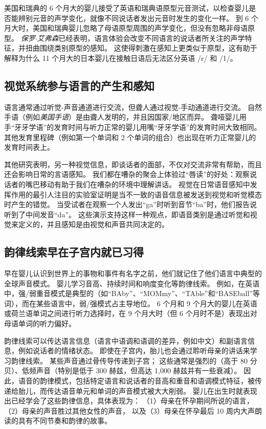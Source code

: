 美国和瑞典的 6 个月大的婴儿接受了英语和瑞典语原型元音测试，以检查婴儿是否能辨别元音的声学变化，就像不同说话者发出元音时发生的变化一样。
到 6 个月大时，美国和瑞典婴儿忽略了母语原型周围的声学变化，但没有忽略非母语原型。
\textit{保罗$\cdot$艾弗森}已经表明，语言体验会改变不同语言的说话者所关注的声学特征，并扭曲围绕类别原型的感知。
这使得刺激在感知上更类似于原型，这有助于解释为什么 11 个月大的日本婴儿在接触日语后无法区分英语 /r/ 和 /1/。



\subsection{视觉系统参与语言的产生和感知}

语言通常通过听觉-声音通道进行交流，但聋人通过视觉-手动通道进行交流。
自然手语（例如\textit{美国手语}）是由聋人发明的，并且因国家/地区而异。
聋哑婴儿用手“牙牙学语”的发育时间与听力正常的婴儿用嘴“牙牙学语”的发育时间大致相同。
其他发育里程碑（例如第一个单词和 2 个单词的组合）也出现在听力正常婴儿的发育时间表上。


其他研究表明，另一种视觉信息，即谈话者的面部，不仅对交流非常有帮助，而且还会影响日常的言语感知。
我们都在嘈杂的聚会上体验过“唇读”的好处：观察说话者的嘴巴移动有助于我们在嘈杂的环境中理解讲话。
视觉在日常语音感知中发挥作用的最引人注目的实验室证明是当不一致的语音信息被发送到视觉和听觉模态时产生的错觉。
当受试者在观察一个人发出“ga”时听到音节“ba”时，他们报告说听到了中间发音“da”。
这些演示支持这样一种观点，即语音类别是通过听觉和视觉来定义的，并且感知是由视觉和声音共同决定的。



\subsection{韵律线索早在子宫内就已习得}

早在婴儿认识到世界上的事物和事件有名字之前，他们就记住了他们语言中典型的全球声音模式。
婴儿学习音高、持续时间和响度变化等韵律线索。
例如，在英语中，强/弱重音模式是典型的（如“BAby”、“MOMmy”、“TAble”和“BASEball”等词），而在某些语言中，弱/强模式占主导地位。
6 个月和 9 个月大的婴儿在英语或荷兰语单词之间进行听力选择时，在 9 个月大时（但 6 个月时不是）表现出对母语单词的听力偏好。


韵律线索可以传达语言信息（语言中语调和语调的差异，例如中文）和副语言信息，例如说话者的情绪状态。
即使在子宫内，胎儿也会通过聆听母亲的讲话来学习韵律线索。
某些声音通过骨传导传递到子宫；
这些通常是强烈的（高于 80 分贝）、低频声音（特别是低于 300 赫兹，但高达 1,000 赫兹并有一些衰减）。
因此，语音的韵律模式，包括特定语言和说话者的音高和重音和语调模式特征，被传递给胎儿，而传达语音单元和单词的声音模式被大大削弱。
婴儿在出生时就表现出已经学会了这些韵律信息，具体表现为：
（1）母亲在怀孕期间所说的语言，（2）母亲的声音胜过其他女性的声音，
以及（3）母亲在怀孕最后 10 周内大声朗读的具有不同节奏和韵律的故事。



